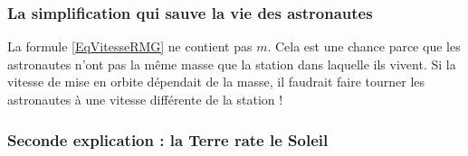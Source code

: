 \subsubsection{La simplification qui sauve la vie des astronautes}

La formule \eqref{EqVitesseRMG} ne contient pas $m$. Cela est une chance parce que les astronautes n'ont pas la même masse que la station dans laquelle ils vivent. Si la vitesse de mise en orbite dépendait de la masse, il faudrait faire tourner les astronautes à une vitesse différente de la station ! 

\subsubsection{Seconde explication : la Terre \og rate\fg{} le Soleil}




